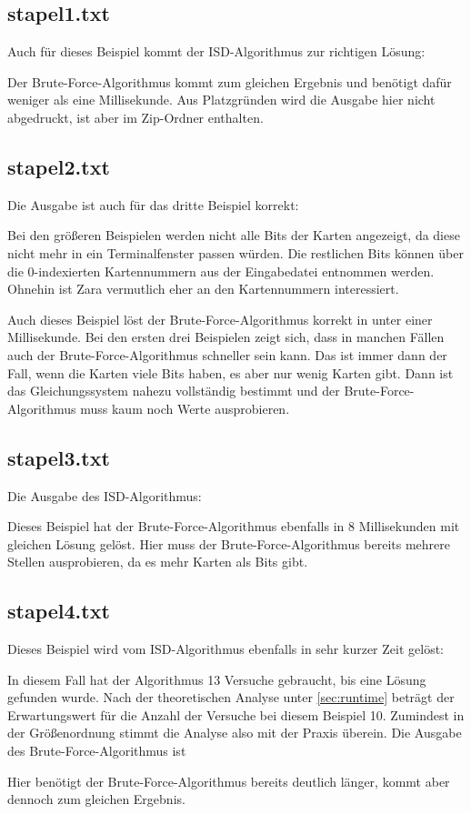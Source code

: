 \documentclass[a4paper,10pt,ngerman]{scrartcl}
\begin{document}
\subsection*{stapel1.txt}
Auch für dieses Beispiel kommt der ISD-Algorithmus zur richtigen Lösung:

Der Brute-Force-Algorithmus kommt zum gleichen Ergebnis und benötigt dafür weniger als eine Millisekunde. Aus Platzgründen wird die Ausgabe hier nicht abgedruckt, ist aber im Zip-Ordner enthalten.
\subsection*{stapel2.txt}
Die Ausgabe ist auch für das dritte Beispiel korrekt:

Bei den größeren Beispielen werden nicht alle Bits der Karten angezeigt, da diese nicht mehr in ein Terminalfenster passen würden. Die restlichen Bits können über die 0-indexierten Kartennummern aus der Eingabedatei entnommen werden. Ohnehin ist Zara vermutlich eher an den Kartennummern interessiert. 

Auch dieses Beispiel löst der Brute-Force-Algorithmus korrekt in unter einer Millisekunde. Bei den ersten drei Beispielen zeigt sich, dass in manchen Fällen auch der Brute-Force-Algorithmus schneller sein kann. Das ist immer dann der Fall, wenn die Karten viele Bits haben, es aber nur wenig Karten gibt. Dann ist das Gleichungssystem nahezu vollständig bestimmt und der Brute-Force-Algorithmus muss kaum noch Werte ausprobieren. 
\subsection*{stapel3.txt}
Die Ausgabe des ISD-Algorithmus:

Dieses Beispiel hat der Brute-Force-Algorithmus ebenfalls in 8 Millisekunden mit gleichen Lösung gelöst.
Hier muss der Brute-Force-Algorithmus bereits mehrere Stellen ausprobieren, da es mehr Karten als Bits gibt.
\subsection*{stapel4.txt}
Dieses Beispiel wird vom ISD-Algorithmus ebenfalls in sehr kurzer Zeit gelöst:

In diesem Fall hat der Algorithmus 13 Versuche gebraucht, bis eine Lösung gefunden wurde. Nach der theoretischen Analyse unter \ref{sec:runtime} beträgt der Erwartungswert für die Anzahl der Versuche bei diesem Beispiel 10. Zumindest in der Größenordnung stimmt die Analyse also mit der Praxis überein. 
Die Ausgabe des Brute-Force-Algorithmus ist

Hier benötigt der Brute-Force-Algorithmus bereits deutlich länger, kommt aber dennoch zum gleichen Ergebnis. 
\end{document}
